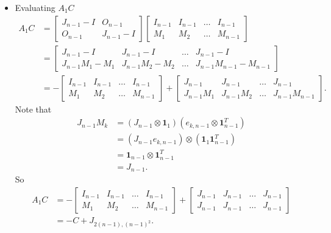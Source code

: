 \begin{itemize}
    \item Evaluating $A_1C$
    \begin{align*}
        A_1C
        &= \begin{bmatrix}
            J_{n-1}-I & O_{n-1} \\
            O_{n-1} & J_{n-1}-I
        \end{bmatrix}
        \begin{bmatrix}
            I_{n-1} & I_{n-1} & \dots & I_{n-1} \\
            M_1 & M_2 & \dots & M_{n-1}
        \end{bmatrix} \\
        &= \begin{bmatrix}
            J_{n-1}-I & J_{n-1}-I & \dots &J_{n-1}-I \\
            J_{n-1}M_1 - M_1 & J_{n-1}M_2-M_2& \dots& J_{n-1}M_{n-1}-M_{n-1}
        \end{bmatrix} \\
        &= -\begin{bmatrix}
            I_{n-1} & I_{n-1} & \dots & I_{n-1} \\
            M_1 & M_2 & \dots & M_{n-1}
        \end{bmatrix} + \begin{bmatrix}
            J_{n-1} & J_{n-1} & \dots &J_{n-1} \\
            J_{n-1}M_1 & J_{n-1}M_2& \dots& J_{n-1}M_{n-1}
        \end{bmatrix}.
    \end{align*}
    Note that 
    \begin{align*}
        J_{n-1}M_k 
        &= (J_{n-1}\otimes \mathbf{1}_1)(e_{k,n-1}\otimes\mathbf{1}_{n-1}^T)\\
        &= (J_{n-1}e_{k,n-1}) \otimes (\mathbf{1}_1\mathbf{1}_{n-1}^T) \\
        &= \mathbf{1}_{n-1}\otimes\mathbf{1}_{n-1}^T \\
        &= J_{n-1}.
    \end{align*}
    So 
    \begin{align*}
        A_1C
        &=-\begin{bmatrix}
            I_{n-1} & I_{n-1} & \dots & I_{n-1} \\
            M_1 & M_2 & \dots & M_{n-1}
        \end{bmatrix} + \begin{bmatrix}
            J_{n-1} & J_{n-1} & \dots &J_{n-1} \\
            J_{n-1} & J_{n-1}& \dots& J_{n-1}
        \end{bmatrix} \\
        &= -C + J_{2(n-1),(n-1)^2}.
    \end{align*}
\end{itemize}

